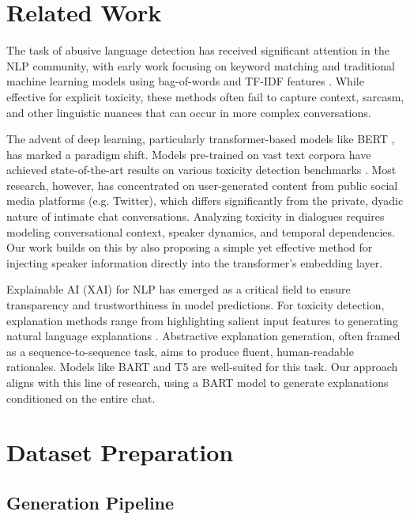 \documentclass[twocolumn]{ceurart}
\begin{document}
\section{Related Work}

The task of abusive language detection has received significant attention in the NLP community, with early work focusing on keyword matching and traditional machine learning models using bag-of-words and TF-IDF features \cite{davidson2017automated}\cite{das2018improved}\cite{zhang2018detecting}. While effective for explicit toxicity, these methods often fail to capture context, sarcasm, and other linguistic nuances that can occur in more complex conversations.

The advent of deep learning, particularly transformer-based models like BERT \cite{devlin2019bert}, has marked a paradigm shift. Models pre-trained on vast text corpora have achieved state-of-the-art results on various toxicity detection benchmarks \cite{vidgen2021learning}. Most research, however, has concentrated on user-generated content from public social media platforms (e.g. Twitter\cite{pak2010twitter}), which differs significantly from the private, dyadic nature of intimate chat conversations. Analyzing toxicity in dialogues requires modeling conversational context, speaker dynamics, and temporal dependencies. Our work builds on this by also proposing a simple yet effective method for injecting speaker information directly into the transformer's embedding layer.

Explainable AI (XAI) for NLP has emerged as a critical field to ensure transparency and trustworthiness in model predictions. For toxicity detection, explanation methods range from highlighting salient input features to generating natural language explanations \cite{riedl2021explainable}. Abstractive explanation generation, often framed as a sequence-to-sequence task, aims to produce fluent, human-readable rationales. Models like BART \cite{lewis2019bart} and T5 \cite{raffel2020exploring} are well-suited for this task. Our approach aligns with this line of research, using a BART model to generate explanations conditioned on the entire chat.

\section{Dataset Preparation}

\subsection{Generation Pipeline}
\end{document}
